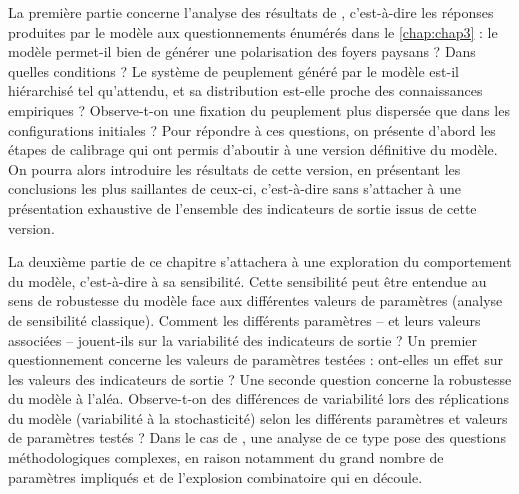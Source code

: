 La première partie concerne l'analyse des \og résultats\fg{} de \simfeodal{}, c'est-à-dire les réponses produites par le modèle aux questionnements énumérés dans le \cref{chap:chap3} :
le modèle permet-il bien de générer une polarisation des foyers paysans ? Dans quelles conditions ?
Le système de peuplement généré par le modèle est-il hiérarchisé tel qu'attendu, et sa distribution est-elle proche des connaissances empiriques ?
Observe-t-on une fixation du peuplement plus dispersée que dans les configurations initiales ?
Pour répondre à ces questions, on présente d'abord les étapes de calibrage qui ont permis d'aboutir à une version \og définitive\fg{} du modèle.
On pourra alors introduire les résultats de cette version, en présentant les conclusions les plus saillantes de ceux-ci, c'est-à-dire sans s'attacher à une présentation exhaustive de l'ensemble des indicateurs de sortie issus de cette version.

La deuxième partie de ce chapitre s'attachera à une exploration du comportement du modèle, c'est-à-dire à sa sensibilité.
Cette sensibilité peut être entendue au sens de robustesse du modèle face aux différentes valeurs de paramètres (analyse de sensibilité classique).
Comment les différents paramètres -- et leurs valeurs associées -- jouent-ils sur la variabilité des indicateurs de sortie ?
Un premier questionnement concerne les valeurs de paramètres testées :  ont-elles un effet sur les valeurs des indicateurs de sortie ?
Une seconde question concerne la robustesse du modèle à l'aléa.
Observe-t-on des différences de variabilité lors des réplications du modèle  (variabilité à la stochasticité) selon les différents paramètres et valeurs de paramètres testés ?
Dans le cas de \simfeodal{}, une analyse de ce type pose des questions méthodologiques complexes, en raison notamment du grand nombre de paramètres impliqués et de \og l'explosion combinatoire\fg{} qui en découle.


